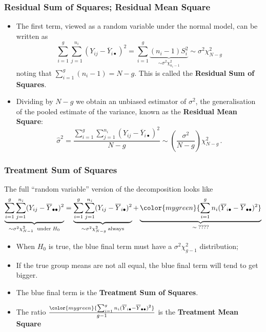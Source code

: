 \documentclass[a4paper]{article}
\begin{document}
\subsubsection{Residual Sum of Squares; Residual Mean Square}
\begin{itemize}
	\item The first term, viewed as a random variable under the normal model, can be written as
	\[
		\sum_{i=1}^g\sum_{j=1}^{n_i}(Y_{ij}-\overline Y_{i\bullet})^2 = \sum_{i=1}^g\underbrace{(n_i-1)S_i^2}_	{\sim\sigma^2\chi^2_{n_i-1}}\sim \sigma^2\chi^2_{N-g}
	\]
	noting that \( \sum_{i=1}^{g} (n_i - 1) = N - g \). This is called the \textbf{Residual Sum of Squares}.
	\item Dividing by \( N - g \) we obtain an unbiased estimator of \( \sigma^2 \), the generalisation of the pooled estimate of the variance, known as the \textbf{Residual Mean Square}:
	\[
		\hat{\sigma}^2 = \frac{\sum_{i=1}^g\sum_{j=1}^{n_i}(Y_{ij}-\overline Y_{i\bullet})^2}{N-g}\sim \left( \frac{\sigma^{2}}{N-g}\right)\chi^2_{N-g}\,.
	\]
\end{itemize}
\subsubsection{Treatment Sum of Squares}
The full ``random variable'' version of the decomposition looks like
\[
	\underbrace{\sum_{i=1}^g\sum_{j=1}^{n_i} (Y_{ij}- \overline Y_{\bullet\bullet})^2}_{\sim \sigma^2\chi^2_{N-1}\;\text{ under}\;H_0} = \underbrace{\sum_{i=1}^g\sum_{j=1}^{n_i}(Y_{ij}-\overline Y_{i\bullet})^2}_{\sim \sigma^2\chi^2_{N-g}\;\text{always}} + \underbrace{\color{mygreen}{\sum_{i=1}^g n_i (\overline Y_{i\bullet}-\overline Y_{\bullet\bullet})^{2}}}_{\sim\;????}
\]
\begin{itemize}
	\item When \( H_0 \) is true, the blue final term must have a \( \sigma^2 \chi^2_{g-1} \) distribution;
	\item If the true group means are not all equal, the blue final term will tend to get bigger.
	\item The blue final term is the \textcolor{mygreen}{\textbf{Treatment Sum of Squares}}.
	\item The ratio \( \frac{\color{mygreen}{\sum_{i=1}^g n_i (\overline Y_{i\bullet}-\overline Y_{\bullet\bullet})^{2}}}{g - 1} \) is the \textbf{Treatment Mean Square} 
\end{itemize}
\end{document}
